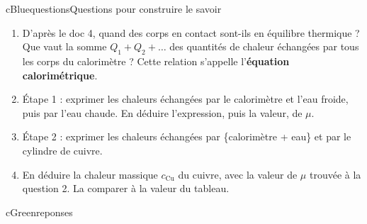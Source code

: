 \begin{rub}{cBlue}{questions}{Questions pour construire le savoir}
\begin{enumerate}
  \item {} D’après le doc 4, quand des corps en contact sont-ils en équilibre thermique ? Que vaut la somme $Q_1 + Q_2 + \dots$ des quantités de chaleur échangées par tous les corps du calorimètre ? Cette relation s’appelle l’\textbf{équation calorimétrique}.
  \item {} Étape 1 : exprimer les chaleurs échangées par le calorimètre et l’eau froide, puis par l’eau chaude. En déduire l’expression, puis la valeur, de $\mu$.
  \item {} Étape 2 : exprimer les chaleurs échangées par \{calorimètre + eau\} et par le cylindre de cuivre.
  \item {} En déduire la chaleur massique $c_{\mathrm{Cu}}$ du cuivre, avec la valeur de $\mu$ trouvée à la question 2. La comparer à la valeur du tableau.
\end{enumerate}
\end{rub}

\begin{rub}{cGreen}{reponses}{\titrereponses}
\begin{reps}
  \item {}
  \item {}
  \item {}
  \item {}
\end{reps}
\end{rub}

